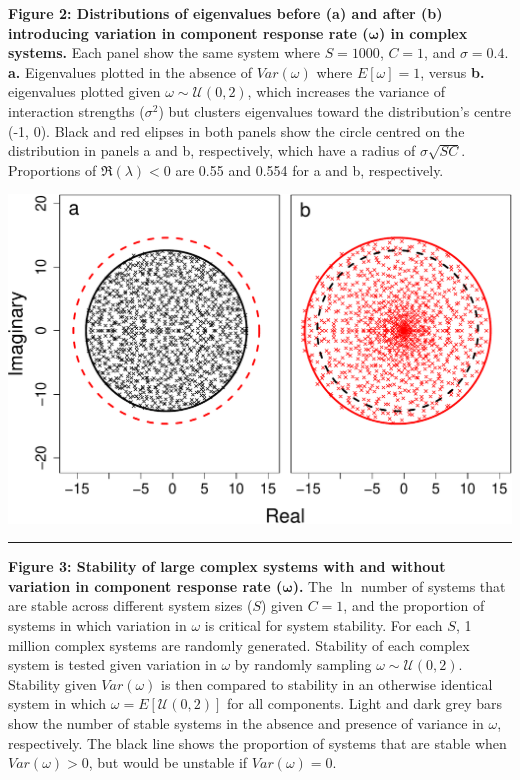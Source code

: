 \documentclass[]{article}
\begin{document}
\textbf{Figure 2: Distributions of eigenvalues before (a) and after (b)
introducing variation in component response rate
(\(\boldsymbol{\omega}\)) in complex systems.} Each panel show the same
system where \(S = 1000\), \(C = 1\), and \(\sigma = 0.4\). \textbf{a.}
Eigenvalues plotted in the absence of \(Var(\omega)\) where
\(E[\omega] = 1\), versus \textbf{b.} eigenvalues plotted given
\(\omega \sim \mathcal{U}(0, 2)\), which increases the variance of
interaction strengths (\(\sigma^{2}\)) but clusters eigenvalues toward
the distribution's centre (-1, 0). Black and red elipses in both panels
show the circle centred on the distribution in panels a and b,
respectively, which have a radius of \(\sigma \sqrt{SC}\). Proportions
of \(\Re(\lambda) < 0\) are 0.55 and 0.554 for a and b, respectively.

\includegraphics{ms_files/figure-latex/unnamed-chunk-8-1.pdf}

\begin{center}\rule{0.5\linewidth}{\linethickness}\end{center}

\textbf{Figure 3: Stability of large complex systems with and without
variation in component response rate (\(\boldsymbol{\omega}\)).} The
\(\ln\) number of systems that are stable across different system sizes
(\(S\)) given \(C = 1\), and the proportion of systems in which
variation in \(\omega\) is critical for system stability. For each
\(S\), 1 million complex systems are randomly generated. Stability of
each complex system is tested given variation in \(\omega\) by randomly
sampling \(\omega \sim \mathcal{U}(0, 2)\). Stability given
\(Var(\omega)\) is then compared to stability in an otherwise identical
system in which \(\omega = E[\mathcal{U}(0, 2)]\) for all components.
Light and dark grey bars show the number of stable systems in the
absence and presence of variance in \(\omega\), respectively. The black
line shows the proportion of systems that are stable when
\(Var(\omega) > 0\), but would be unstable if \(Var(\omega) = 0\).
\end{document}

